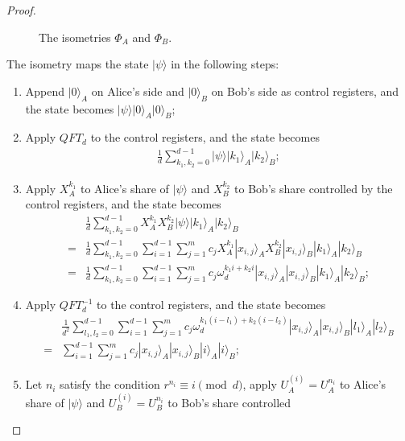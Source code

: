 \documentclass[11pt,letterpaper]{article}
\newcommand{\ket}[1]{|#1\rangle}
\newcommand{\1}{\mathbb{1}}
\newcommand{\EPR}[1]{EPR^{(#1)}}
\theoremstyle{definition}
\begin{document}
\begin{proof}
\begin{figure}[H]
	\caption{The isometries $\Phi_A$ and $\Phi_B$.}
\end{figure}
The isometry maps the state $\ket{\psi}$ in the following steps:
\begin{enumerate}
	\item Append $\ket{0}_A$ on Alice's side and $\ket{0}_B$ on Bob's side as control registers, and
	the state becomes $\ket{\psi} \ket{0}_A \ket{0}_B$;
	\item Apply $QFT_d$ to the control registers, and the state becomes
	\begin{align}
		\frac{1}{d} \sum_{k_1,k_2 =0}^{d-1} \ket{\psi} \ket{k_1}_A \ket{k_2}_B;
	\end{align}
	\item Apply $X_A^{k_1}$ to Alice's share of $\ket{\psi}$ and $X_B^{k_2}$ to Bob's share controlled
	by the control registers, and the state becomes
	\begin{align}
		&\frac{1}{d} \sum_{k_1,k_2 =0}^{d-1}X_A^{k_1} X_B^{k_2}\ket{\psi} \ket{k_1}_A \ket{k_2}_B\\
		=&\frac{1}{d} \sum_{k_1,k_2 =0}^{d-1} \sum_{i=1}^{d-1}\sum_{j=1}^m c_j X_A^{k_1}\ket{x_{i,j}}_A X_B^{k_2}\ket{x_{i,j}}_B
		\ket{k_1}_A \ket{k_2}_B\\
		=&\frac{1}{d} \sum_{k_1,k_2 =0}^{d-1} \sum_{i=1}^{d-1}\sum_{j=1}^m c_j \omega_d^{k_1i+k_2i} \ket{x_{i,j}}_A\ket{x_{i,j}}_B
		\ket{k_1}_A \ket{k_2}_B;
	\end{align}
	\item Apply $QFT_d^{-1}$ to the control registers, and the state becomes
	\begin{align}
		&\frac{1}{d^2} \sum_{l_1,l_2 =0}^{d-1}\sum_{i=1}^{d-1}\sum_{j=1}^m c_j \omega_d^{k_1(i-l_1)+k_2(i-l_2)} \ket{x_{i,j}}_A\ket{x_{i,j}}_B
		\ket{l_1}_A \ket{l_2}_B\\
		=& \sum_{i=1}^{d-1}\sum_{j=1}^m c_j \ket{x_{i,j}}_A\ket{x_{i,j}}_B \ket{i}_A \ket{i}_B;
	\end{align}
	\item Let $n_i$ satisfy the condition $r^{n_i} \equiv i \pmod{d}$, apply $U_A^{(i)} = U_A^{n_i}$ to Alice's share of $\ket{\psi}$ and $U_B^{(i)} = U_B^{n_i}$ to Bob's share controlled

\end{enumerate}
\end{proof}
\end{document}
